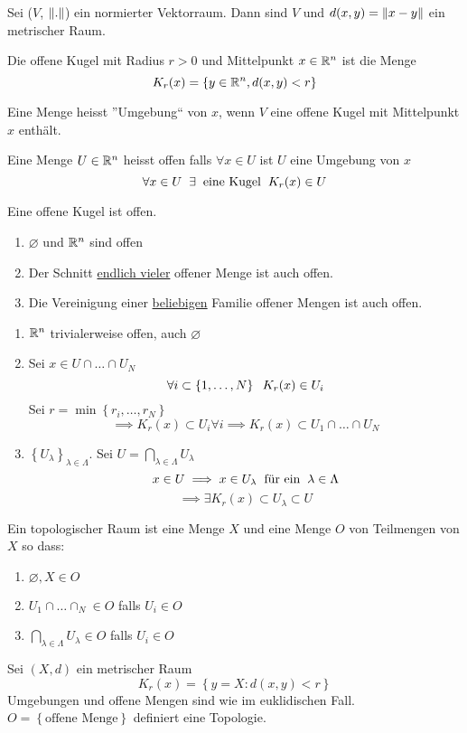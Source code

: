 \begin{Lem}
  Sei ($V$, $\left\| . \right\|$) ein normierter Vektorraum. Dann sind $V$ und $d(x,y)=\left\| x-y \right\|$ ein metrischer Raum.
\end{Lem}
\begin{Def}
  Die offene Kugel mit Radius $r>0$ und Mittelpunkt $x\in\mathbb{R}^n$ ist die Menge
  \[K_r(x)=\left\{ y\in\mathbb{R}^n, d(x,y)<r \right\}\]
\end{Def}
\begin{Def}
  Eine Menge heisst ''Umgebung`` von $x$, wenn $V$ eine offene Kugel mit Mittelpunkt $x$ enthält.
\end{Def}
\begin{Def}
  Eine Menge $U\in\mathbb{R}^n$ heisst offen falls $\forall x\in U$ ist $U$ eine Umgebung von $x$
  \[\forall x\in U\hspace{2mm}\exists \hspace{2mm}\text{eine Kugel}\hspace{2mm} K_r(x)\in U\]
\end{Def}
\begin{Bem}
  Eine offene Kugel ist offen.
\end{Bem}
\begin{Sat}
  \begin{enumerate}
    \item $\varnothing$ und $\mathbb{R}^n$ sind offen
    \item Der Schnitt \ul{endlich vieler} offener Menge ist auch offen.
    \item Die Vereinigung einer \ul{beliebigen} Familie offener Mengen ist auch offen.
  \end{enumerate}
\end{Sat}
\begin{Bew}
  \begin{enumerate}
    \item $\mathbb{R}^n$ trivialerweise offen, auch $\varnothing$
    \item Sei $x\in U\cap\dots\cap U_N$
      \[\forall i\subset\left\{ 1,\dots,N \right\}\hspace{2mm} K_r(x)\in U_i\]
      Sei $r=\min\left\{ r_i,\dots,r_N \right\}$
      \[\implies K_r(x)\subset U_i\forall i\implies K_r(x)\subset U_1\cap\dots\cap U_N\]
    \item $\left\{ U_\lambda \right\}_{\lambda\in \Lambda}$. Sei $U=\bigcap_{\lambda\in\Lambda}U_\lambda$
      \[x\in U\implies x\in U_\lambda\hspace{2mm}\text{für ein}\hspace{2mm}\lambda\in\Lambda\]
      \[\implies \exists K_r(x)\subset U_\lambda\subset U\]
  \end{enumerate}
\end{Bew}
\begin{Def}
  Ein topologischer Raum ist eine Menge $X$ und eine Menge $O$ von Teilmengen von $X$ so dass:
  \begin{enumerate}
    \item $\varnothing, X\in O$
    \item $U_1\cap\dots\cap_N\in O$ falls $U_i\in O$
    \item $\bigcap_{\lambda\in\Lambda}U_\lambda\in O$ falls $U_i\in O$
  \end{enumerate}
\end{Def}
\begin{Sat}
  Sei $(X,d)$ ein metrischer Raum
  \[K_r(x)=\left\{ y=X: d(x,y)<r \right\}\]
  Umgebungen und offene Mengen sind wie im euklidischen Fall. $O=\left\{ \text{offene Menge} \right\}$ definiert eine Topologie.
\end{Sat}
